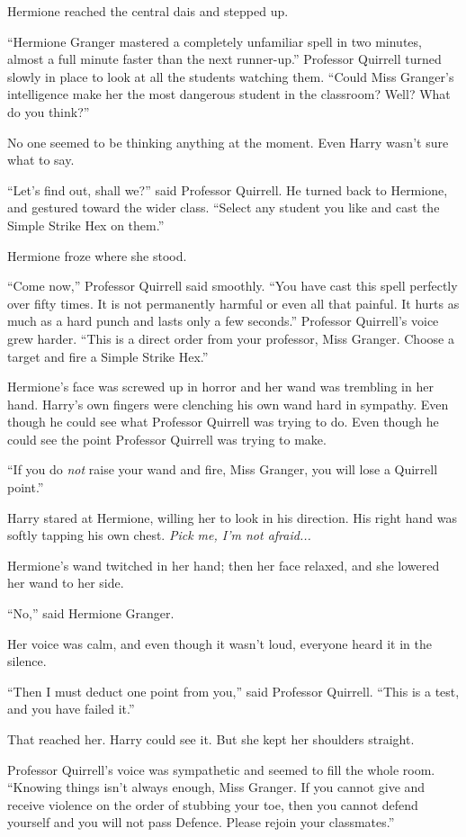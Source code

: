 Hermione reached the central dais and stepped up.

``Hermione Granger mastered a completely unfamiliar spell in two
minutes, almost a full minute faster than the next runner-up.''
Professor Quirrell turned slowly in place to look at all the students
watching them. ``Could Miss Granger's intelligence make her the most
dangerous student in the classroom? Well? What do you think?''

No one seemed to be thinking anything at the moment. Even Harry wasn't
sure what to say.

``Let's find out, shall we?'' said Professor Quirrell. He turned back to
Hermione, and gestured toward the wider class. ``Select any student you
like and cast the Simple Strike Hex on them.''

Hermione froze where she stood.

``Come now,'' Professor Quirrell said smoothly. ``You have cast this
spell perfectly over fifty times. It is not permanently harmful or even
all that painful. It hurts as much as a hard punch and lasts only a few
seconds.'' Professor Quirrell's voice grew harder. ``This is a direct
order from your professor, Miss Granger. Choose a target and fire a
Simple Strike Hex.''

Hermione's face was screwed up in horror and her wand was trembling in
her hand. Harry's own fingers were clenching his own wand hard in
sympathy. Even though he could see what Professor Quirrell was trying to
do. Even though he could see the point Professor Quirrell was trying to
make.

``If you do \emph{not} raise your wand and fire, Miss Granger, you will
lose a Quirrell point.''

Harry stared at Hermione, willing her to look in his direction. His
right hand was softly tapping his own chest. \emph{Pick me, I'm not
afraid...}

Hermione's wand twitched in her hand; then her face relaxed, and she
lowered her wand to her side.

``No,'' said Hermione Granger.

Her voice was calm, and even though it wasn't loud, everyone heard it in
the silence.

``Then I must deduct one point from you,'' said Professor Quirrell.
``This is a test, and you have failed it.''

That reached her. Harry could see it. But she kept her shoulders
straight.

Professor Quirrell's voice was sympathetic and seemed to fill the whole
room. ``Knowing things isn't always enough, Miss Granger. If you cannot
give and receive violence on the order of stubbing your toe, then you
cannot defend yourself and you will not pass Defence. Please rejoin your
classmates.''

